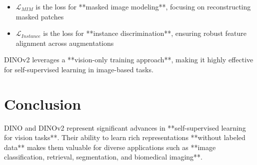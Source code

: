 \documentclass[
]{book}
\begin{document}
\begin{itemize}
\item
  \(\mathcal{L}_{MIM}\) is the loss for **masked image modeling**,
  focusing on reconstructing masked patches
\item
  \(\mathcal{L}_{Instance}\) is the loss for **instance
  discrimination**, ensuring robust feature alignment across
  augmentations
\end{itemize}

DINOv2 leverages a **vision-only training approach**, making it
highly effective for self-supervised learning in image-based tasks.

\chapter{Conclusion}\label{conclusion-4}

DINO and DINOv2 represent significant advances in **self-supervised
learning for vision tasks**. Their ability to learn rich
representations **without labeled data** makes them valuable for
diverse applications such as **image classification, retrieval,
segmentation, and biomedical imaging**.

  
\end{document}
